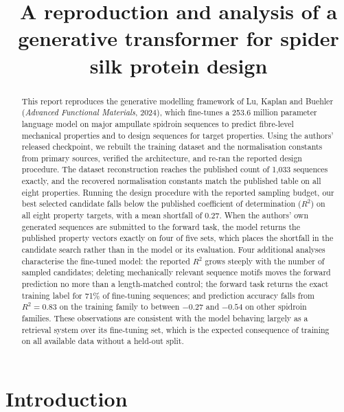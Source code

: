 \documentclass[11pt,a4paper]{article}
\title{\vspace{-1.2cm}\bfseries A reproduction and analysis of a generative
transformer for spider silk protein design}
\author{}
\date{}
\begin{document}
\maketitle
\vspace{-1.0cm}

\begin{abstract}
\noindent
This report reproduces the generative modelling framework of Lu, Kaplan and
Buehler (\textit{Advanced Functional Materials}, 2024), which fine-tunes a
253.6 million parameter language model on major ampullate spidroin sequences to
predict fibre-level mechanical properties and to design sequences for target
properties. Using the authors' released checkpoint, we rebuilt the training
dataset and the normalisation constants from primary sources, verified the
architecture, and re-ran the reported design procedure. The dataset
reconstruction reaches the published count of 1{,}033 sequences exactly, and the
recovered normalisation constants match the published table on all eight
properties. Running the design procedure with the reported sampling budget, our
best selected candidate falls below the published coefficient of determination
($R^2$) on all eight property targets, with a mean shortfall of 0.27. When the
authors' own generated sequences are submitted to the forward task, the model
returns the published property vectors exactly on four of five sets, which
places the shortfall in the candidate search rather than in the model or its
evaluation. Four additional analyses characterise the fine-tuned model: the
reported $R^2$ grows steeply with the number of sampled candidates; deleting
mechanically relevant sequence motifs moves the forward prediction no more than
a length-matched control; the forward task returns the exact training label for
71\% of fine-tuning sequences; and prediction accuracy falls from
$R^2 = 0.83$ on the training family to between $-0.27$ and $-0.54$ on other
spidroin families. These observations are consistent with the model behaving
largely as a retrieval system over its fine-tuning set, which is the expected
consequence of training on all available data without a held-out split.
\end{abstract}

\section{Introduction}
\end{document}
